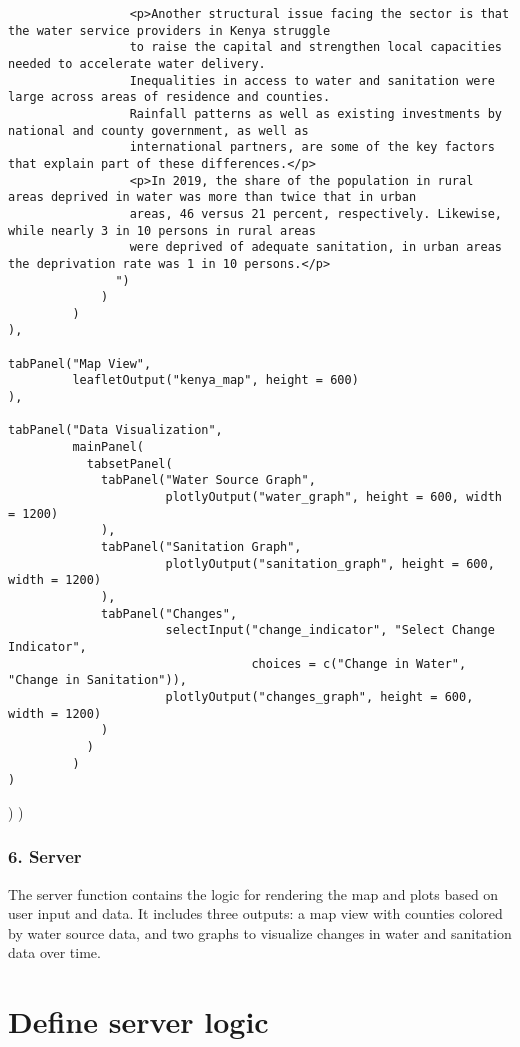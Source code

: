 \documentclass[
]{article}
\begin{document}
\begin{verbatim}
                 <p>Another structural issue facing the sector is that the water service providers in Kenya struggle 
                 to raise the capital and strengthen local capacities needed to accelerate water delivery. 
                 Inequalities in access to water and sanitation were large across areas of residence and counties. 
                 Rainfall patterns as well as existing investments by national and county government, as well as 
                 international partners, are some of the key factors that explain part of these differences.</p>
                 <p>In 2019, the share of the population in rural areas deprived in water was more than twice that in urban 
                 areas, 46 versus 21 percent, respectively. Likewise, while nearly 3 in 10 persons in rural areas 
                 were deprived of adequate sanitation, in urban areas the deprivation rate was 1 in 10 persons.</p>
               ")
             )
         )
),

tabPanel("Map View",
         leafletOutput("kenya_map", height = 600)
),

tabPanel("Data Visualization",
         mainPanel(
           tabsetPanel(
             tabPanel("Water Source Graph",
                      plotlyOutput("water_graph", height = 600, width = 1200)
             ),
             tabPanel("Sanitation Graph",
                      plotlyOutput("sanitation_graph", height = 600, width = 1200)
             ),
             tabPanel("Changes",
                      selectInput("change_indicator", "Select Change Indicator", 
                                  choices = c("Change in Water", "Change in Sanitation")),
                      plotlyOutput("changes_graph", height = 600, width = 1200)
             )
           )
         )
)
\end{verbatim}

) )

\subsubsection{6. Server}\label{server}

The server function contains the logic for rendering the map and plots
based on user input and data. It includes three outputs: a map view with
counties colored by water source data, and two graphs to visualize
changes in water and sanitation data over time.

\section{Define server logic}\label{define-server-logic}
\end{document}
